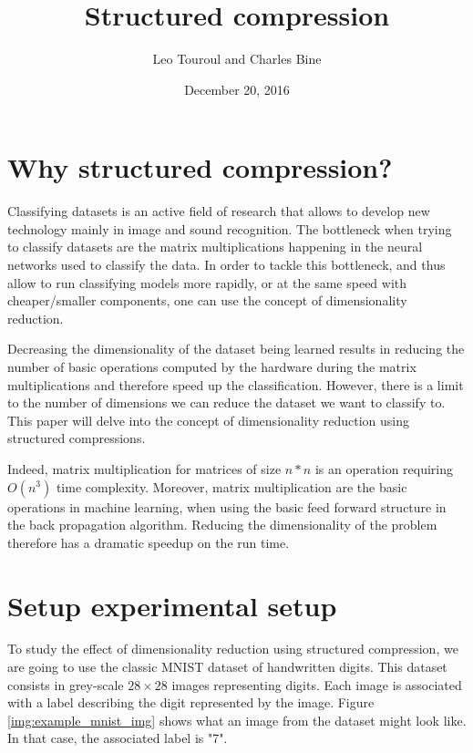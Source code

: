 \documentclass[11pt,a4paper]{article}
\author{Leo Touroul and Charles Bine}
\title{Structured compression}
\date{December 20, 2016}
\begin{document}
	\maketitle

	\section{Why structured compression?}
	
	
	
	Classifying datasets is an active field of research that allows to develop new technology mainly in image and sound recognition.
	The bottleneck when trying to classify datasets are the matrix multiplications happening in the neural networks used to classify the data.
	In order to tackle this bottleneck, and thus allow to run classifying models more rapidly, or at the same speed with cheaper/smaller components, one can use the concept of dimensionality reduction.
	
	Decreasing the dimensionality of the dataset being learned results in reducing the number of basic operations computed by the hardware during the matrix multiplications and therefore speed up the classification.
	However, there is a limit to the number of dimensions we can reduce the dataset we want to classify to. This paper will delve into the concept of dimensionality reduction using structured compressions.
	
	Indeed, matrix multiplication for matrices of size $n*n$ is an operation requiring $O(n^3)$ time complexity. Moreover, matrix multiplication are the basic operations in machine learning, when using the basic feed forward structure in the back propagation algorithm. Reducing the dimensionality of the problem therefore has a dramatic speedup on the run time.
	
	
	

	
	\section{Setup experimental setup}
	
	To study the effect of dimensionality reduction using structured compression, we are going to use the classic MNIST dataset of handwritten digits. This dataset consists in grey-scale $28 \times 28$ images representing digits. Each image is associated with a label describing the digit represented by the image. Figure \ref{img:example_mnist_img} shows what an image from the dataset might look like. In that case, the associated label is "7". 
	
\end{document}
